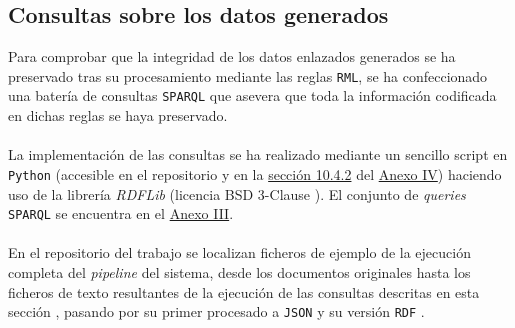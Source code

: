     \subsection{Consultas sobre los datos generados} \label{subsec:rdflib}
        Para comprobar que la integridad de los datos enlazados generados se ha preservado tras su procesamiento mediante las reglas \texttt{RML}, se ha confeccionado una batería de consultas \texttt{SPARQL} que asevera que toda la información codificada en dichas reglas se haya preservado.
        \\ \\
        La implementación de las consultas se ha realizado mediante un sencillo script en \texttt{Python} (accesible en el repositorio \cite{SCRIPTRDF} y en la \hyperref[subsubsec:py2]{sección 10.4.2} del \hyperref[annex:scriptspy]{Anexo IV}) haciendo uso de la librería \textit{RDFLib} (licencia BSD 3-Clause \cite{LICBSD3}). El conjunto de \textit{queries} \texttt{SPARQL} se encuentra en el \hyperref[annex:sparql]{Anexo III}.
        \\ \\
        En el repositorio del trabajo se localizan ficheros de ejemplo de la ejecución completa del \textit{pipeline} del sistema, desde los documentos originales \cite{TFGEJ1} hasta los ficheros de texto resultantes de la ejecución de las consultas descritas en esta sección \cite{TFGEJ2}, pasando por su primer procesado a \texttt{JSON} \cite{TFGEJ3} y su versión \texttt{RDF} \cite{TFGEJ4}.
        
